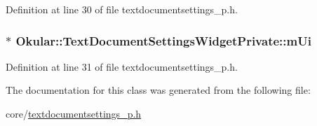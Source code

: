 Definition at line 30 of file textdocumentsettings\+\_\+p.\+h.

\hypertarget{classOkular_1_1TextDocumentSettingsWidgetPrivate_a07370b4ba0b71279eabd2dc859cec07c}{
\subsubsection[{m\+Ui}]{$\ast$ Okular\+::\+Text\+Document\+Settings\+Widget\+Private\+::m\+Ui}}\label{classOkular_1_1TextDocumentSettingsWidgetPrivate_a07370b4ba0b71279eabd2dc859cec07c}


Definition at line 31 of file textdocumentsettings\+\_\+p.\+h.



The documentation for this class was generated from the following file\+:\begin{DoxyCompactItemize}
\item 
core/\hyperlink{textdocumentsettings__p_8h}{textdocumentsettings\+\_\+p.\+h}\end{DoxyCompactItemize}
